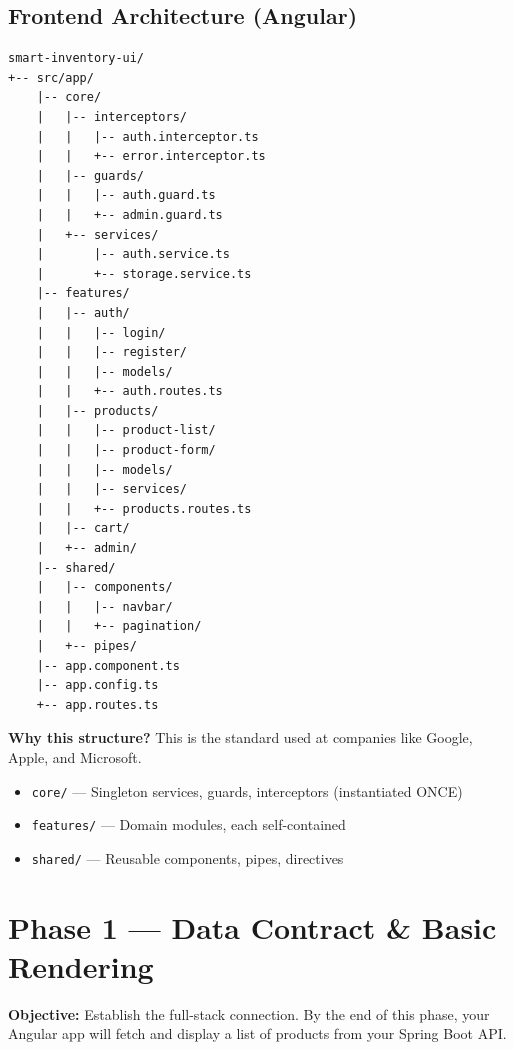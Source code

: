\documentclass[12pt,a4paper]{report}
\begin{document}
\section{Frontend Architecture (Angular)}

\begin{lstlisting}[style=yamlstyle, title={Angular Project Structure}]
smart-inventory-ui/
+-- src/app/
    |-- core/
    |   |-- interceptors/
    |   |   |-- auth.interceptor.ts
    |   |   +-- error.interceptor.ts
    |   |-- guards/
    |   |   |-- auth.guard.ts
    |   |   +-- admin.guard.ts
    |   +-- services/
    |       |-- auth.service.ts
    |       +-- storage.service.ts
    |-- features/
    |   |-- auth/
    |   |   |-- login/
    |   |   |-- register/
    |   |   |-- models/
    |   |   +-- auth.routes.ts
    |   |-- products/
    |   |   |-- product-list/
    |   |   |-- product-form/
    |   |   |-- models/
    |   |   |-- services/
    |   |   +-- products.routes.ts
    |   |-- cart/
    |   +-- admin/
    |-- shared/
    |   |-- components/
    |   |   |-- navbar/
    |   |   +-- pagination/
    |   +-- pipes/
    |-- app.component.ts
    |-- app.config.ts
    +-- app.routes.ts
\end{lstlisting}

\begin{infobox}
\textbf{Why this structure?} This is the standard used at companies like Google, Apple, and Microsoft.
\begin{itemize}
    \item \texttt{core/} --- Singleton services, guards, interceptors (instantiated ONCE)
    \item \texttt{features/} --- Domain modules, each self-contained
    \item \texttt{shared/} --- Reusable components, pipes, directives
\end{itemize}
\end{infobox}

\chapter{Phase 1 --- Data Contract \& Basic Rendering}

\textbf{Objective:} Establish the full-stack connection. By the end of this phase, your Angular app will fetch and display a list of products from your Spring Boot API.
\end{document}
